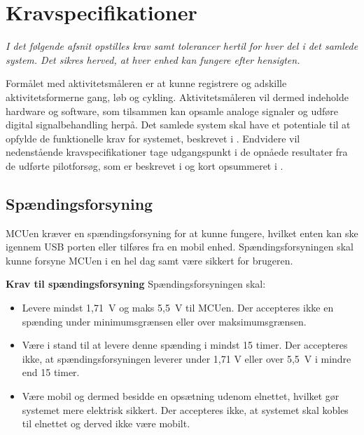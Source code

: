 	\section{Kravspecifikationer}\label{Sec:krav}
\textit{I det følgende afsnit opstilles krav samt tolerancer hertil for hver del i det samlede system. Det sikres herved, at hver enhed kan fungere efter hensigten.}

Formålet med aktivitetsmåleren er at kunne registrere og adskille aktivitetsformerne gang, løb og cykling. Aktivitetsmåleren vil dermed indeholde hardware og software, som tilsammen kan opsamle analoge signaler og udføre digital signalbehandling herpå. Det samlede system skal have et potentiale til at opfylde de funktionelle krav for systemet, beskrevet i . Endvidere vil nedenstående kravspecifikationer tage udgangspunkt i de opnåede resultater fra de udførte pilotforsøg, som er beskrevet i  og kort opsummeret i .
%

\subsection{Spændingsforsyning} \label{krav_spaendingsf}
MCUen kræver en spændingsforsyning for at kunne fungere, hvilket enten kan ske igennem USB porten eller tilføres fra en mobil enhed. Spændingsforsyningen skal kunne forsyne MCUen i en hel dag samt være sikkert for brugeren. %

\textbf{Krav til spændingsforsyning} \newline 
Spændingsforsyningen skal:
\begin{itemize}
	\item Levere mindst 1,71~V og maks 5,5~V til MCUen. Der accepteres ikke en spænding under minimumsgrænsen eller over maksimumsgrænsen. %
	\item Være i stand til at levere denne spænding i mindst 15 timer. Der accepteres ikke, at spændingsforsyningen leverer under 1,71 V eller over 5,5~V i mindre end 15 timer.
	\item Være mobil og dermed besidde en opsætning udenom elnettet, hvilket gør systemet mere elektrisk sikkert. Der accepteres ikke, at systemet skal kobles til elnettet og derved ikke være mobilt.
\end{itemize}

